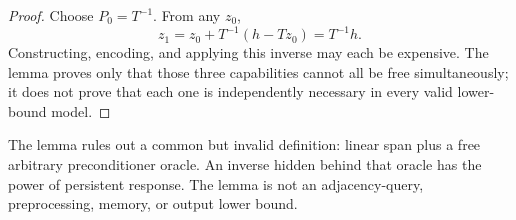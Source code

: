 \begin{proof}
Choose $P_0=T^{-1}$.  From any $z_0$,
\[
 z_1=z_0+T^{-1}(h-Tz_0)=T^{-1}h.
\]
Constructing, encoding, and applying this inverse may each be expensive.  The
lemma proves only that those three capabilities cannot all be free
simultaneously; it does not prove that each one is independently necessary in
every valid lower-bound model.
\end{proof}

The lemma rules out a common but invalid definition: linear span plus a free
arbitrary preconditioner oracle.  An inverse hidden behind that oracle has the
power of persistent response.  The lemma is not an adjacency-query,
preprocessing, memory, or output lower bound.
